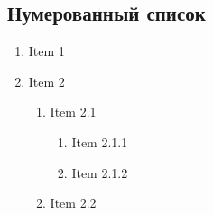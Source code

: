 \subsection{Нумерованный список}
\renewcommand{\labelenumii}{\arabic{enumi}.\arabic{enumii}.}
\renewcommand{\labelenumiii}{\arabic{enumi}.\arabic{enumii}.\arabic{enumiii}.}
\begin{enumerate}
    \item Item 1
    \item Item 2
    \begin{enumerate}
        \item Item 2.1
        \begin{enumerate}
            \item Item 2.1.1
            \item Item 2.1.2
        \end{enumerate}
        \item Item 2.2
    \end{enumerate}
\end{enumerate}